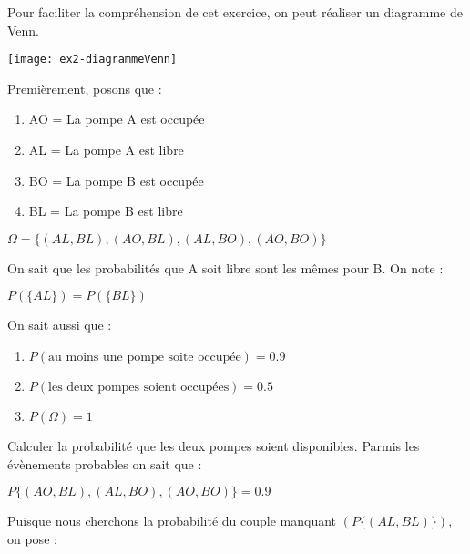 	\begin{exo}

		Pour faciliter la compréhension de cet exercice, on peut réaliser un diagramme de Venn.
		\begin{center}\texttt{[image: ex2-diagrammeVenn]}\end{center}
		Premièrement, posons que :
		\begin{multicols}{4}
			\begin{enumerate}[label=\alph*), parsep=0cm, itemsep=3mm, topsep=3mm]
				\item[ ] AO = La pompe A est occupée
				\item[ ] AL = La pompe A est libre
				\item[ ] BO = La pompe B est occupée
				\item[ ] BL = La pompe B est libre
			\end{enumerate}
		\end{multicols}
		\begin{center}$\Omega = \{(AL,BL),(AO,BL),(AL,BO),(AO,BO)\}$ \end{center}
		On sait que les probabilités que A soit libre sont les mêmes pour B. On note :
		\begin{center}$P(\{AL\}) = P(\{BL\})$\end{center}
		On sait aussi que :
		\begin{enumerate}
			\item[ ] $P(\text{au moins une pompe soite occupée}) = 0.9$
			\item[ ] $P(\text{les deux pompes soient occupées}) = 0.5$
			\item[ ] $P(\Omega) = 1$
		\end{enumerate}
		\begin{subexo}{Calculer la probabilité que les deux pompes soient disponibles.}
			Parmis les évènements probables on sait que : 
			\begin{center}$P\{(AO,BL),(AL,BO),(AO,BO)\} = 0.9$\end{center}
			Puisque nous cherchons la probabilité du couple manquant $(P\{(AL,BL)\})$, on pose :

\end{subexo}
\end{exo}
